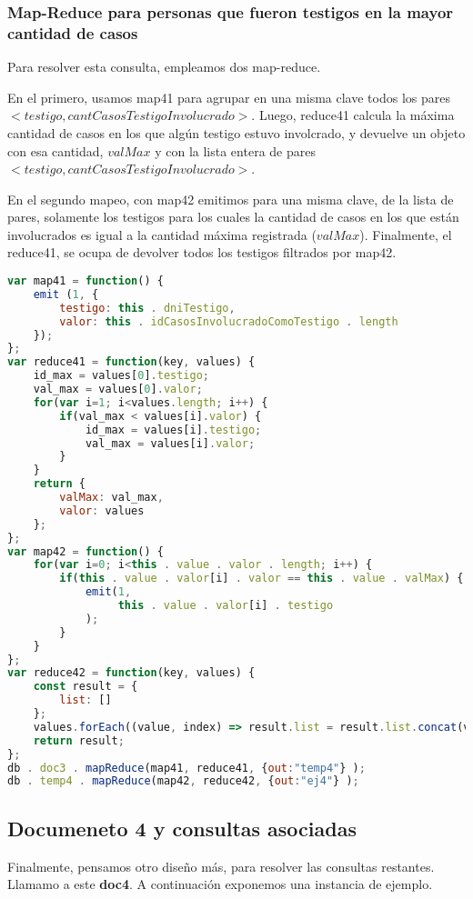 \documentclass[11pt, a4paper]{article}
\begin{document}
\subsubsection{Map-Reduce para personas que fueron testigos en la mayor cantidad de casos}

Para resolver esta consulta, empleamos dos map-reduce.

En el primero, usamos map41 para agrupar en una misma clave todos los pares $<testigo, cantCasosTestigoInvolucrado>$. Luego, reduce41 calcula la máxima cantidad de casos en los que algún testigo estuvo involcrado, y devuelve un objeto con esa cantidad, $valMax$ y con la lista entera de pares $<testigo, cantCasosTestigoInvolucrado>$. 

En el segundo mapeo, con map42 emitimos para una misma clave, de la lista de pares, solamente los testigos para los cuales la cantidad de casos en los que están involucrados es igual a la cantidad máxima registrada ($valMax$). Finalmente, el reduce41, se ocupa de devolver todos los testigos filtrados por map42. 

\begin{lstlisting}[language=JavaScript]
var map41 = function() {
    emit (1, {
        testigo: this . dniTestigo, 
        valor: this . idCasosInvolucradoComoTestigo . length
    });
};
var reduce41 = function(key, values) {
    id_max = values[0].testigo;
    val_max = values[0].valor;
    for(var i=1; i<values.length; i++) {
        if(val_max < values[i].valor) {
            id_max = values[i].testigo;
            val_max = values[i].valor;
        }
    }
    return {
        valMax: val_max,
        valor: values
    };
};
var map42 = function() {
    for(var i=0; i<this . value . valor . length; i++) {
        if(this . value . valor[i] . valor == this . value . valMax) {  
            emit(1, 
                 this . value . valor[i] . testigo
            );
        }
    }
};
var reduce42 = function(key, values) {
    const result = {
        list: []
    };
    values.forEach((value, index) => result.list = result.list.concat(value));
    return result;
};
db . doc3 . mapReduce(map41, reduce41, {out:"temp4"} );
db . temp4 . mapReduce(map42, reduce42, {out:"ej4"} );
\end{lstlisting}
\subsection{Documeneto 4 y consultas asociadas}

Finalmente, pensamos otro diseño más, para resolver las consultas restantes. Llamamo a este \textbf{doc4}. A continuación exponemos una instancia de ejemplo.
\end{document}
